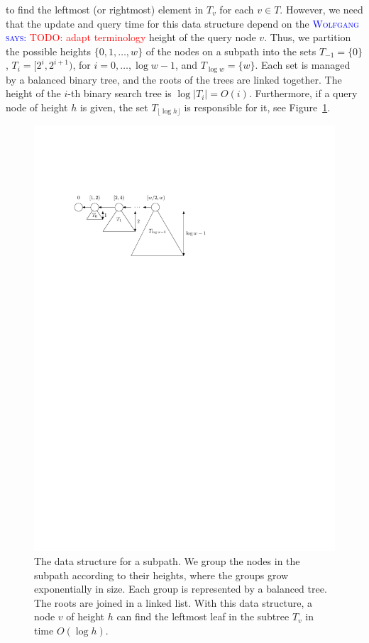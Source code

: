 \documentclass[a4paper,11pt]{article}
\newcommand{\?}{\mskip1.5mu}
\newcommand{\aremark}[3]{\textcolor{blue}{\textsc{#1 #2:}}
  \textcolor{red}{\textsf{#3}}}
\newcommand{\wolfgang}[2][says]{\aremark{Wolfgang}{#1}{#2}}
\begin{document}
to find the leftmost (or rightmost) element in $T_v$
for each $v \in T$.
However, we need that the update and query time for this
data structure
depend on the \wolfgang{TODO: adapt terminology} height  
of the query node $v$.
Thus, we partition the possible heights
$\{0, 1, \dots, w\}$ of the nodes on a 
subpath into the sets
$T_{-1} = \{0\}$, $T_i =[2^i, 2^{i+1})$, for $i = 0,\dots,\log w-1$, 
and $T_{\log w} = \{w\}$.
Each set is managed by a balanced binary tree, and the 
roots of the trees are linked together. The height of the $i$-th binary 
search tree is $\log |T_i| = O(i)$. Furthermore, if a query node
of height $h$ is given, 
the set $T_{\lfloor \log h \rfloor}$ is responsible for it, see 
Figure~\ref{fig:queryds}.
\begin{figure}
\centering
\includegraphics{queryds}
\caption{The data structure for a subpath. We group the nodes
in the subpath according to their heights, where the groups
grow exponentially in size. Each group is represented by a
balanced tree. The roots are joined in a linked
list. With this data structure, a node $v$ of height $h$ can
find the leftmost leaf in the subtree $T_v$ in time $O(\log h)$.}
\label{fig:queryds}
\end{figure}
\end{document}
